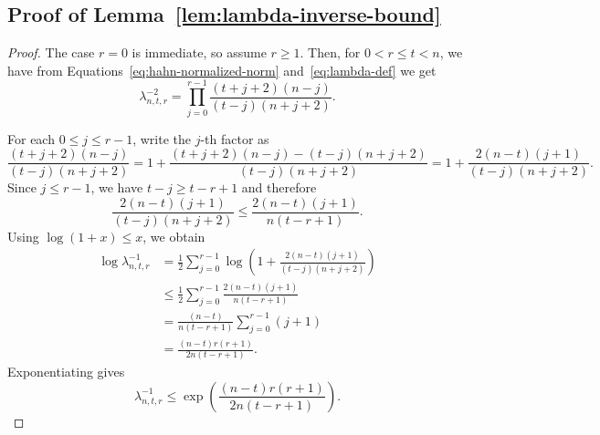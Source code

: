 \documentclass[manuscript,nonacm]{acmart}
\begin{document}
\subsection{Proof of Lemma~\ref{lem:lambda-inverse-bound}}
\begin{proof}
The case \(r=0\) is immediate, so assume \(r\ge 1\). Then, for $0<r\leq t<n$, we have from Equations~\ref{eq:hahn-normalized-norm} and~\ref{eq:lambda-def} we get
\[
    \lambda_{n,t,r}^{-2}=
    \prod_{j=0}^{r-1}
    \frac{(t+j+2)(n-j)}
         {(t-j)(n+j+2)}.
\]

For each \(0\le j\le r-1\), write the \(j\)-th factor as
\[
    \frac{(t+j+2)(n-j)}
         {(t-j)(n+j+2)}
    =
    1+
    \frac{
        (t+j+2)(n-j)-(t-j)(n+j+2)
    }
    {(t-j)(n+j+2)}
    =
    1+
    \frac{2(n-t)(j+1)}{(t-j)(n+j+2)}.
\]
Since \(j\le r-1\), we have $t-j\ge t-r+1$ and therefore
\[
    \frac{2(n-t)(j+1)}
         {(t-j)(n+j+2)}
    \le
    \frac{2(n-t)(j+1)}
         {n(t-r+1)}.
\]
Using \(\log(1+x)\le x\), we obtain
\[
\begin{aligned}
    \log \lambda_{n,t,r}^{-1}
    &=
    \frac12
    \sum_{j=0}^{r-1}
    \log\!\left(
        1+
        \frac{2(n-t)(j+1)}
             {(t-j)(n+j+2)}
    \right)                                                     \\
    &\le
    \frac12
    \sum_{j=0}^{r-1}
    \frac{2(n-t)(j+1)}
         {n(t-r+1)}                                         \\
    &=
    \frac{(n-t)}
         {n(t-r+1)}
    \sum_{j=0}^{r-1}(j+1)                                      \\
    &=
    \frac{(n-t)r(r+1)}
         {2n(t-r+1)}.
\end{aligned}
\]
Exponentiating gives
\[
    \lambda_{n,t,r}^{-1}
    \le
    \exp\!\left(
        \frac{(n-t)r(r+1)}
             {2n(t-r+1)}
    \right).
\]
\end{proof}
\end{document}
